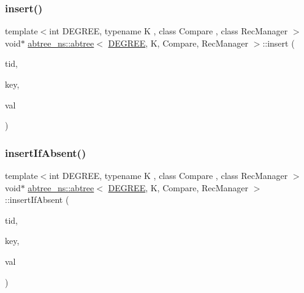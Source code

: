 \mbox{\label{classabtree__ns_1_1abtree_a951a74f5690dbbaf55ab121fa3b5c6ca}} 
\subsubsection{\texorpdfstring{insert()}{insert()}\hspace{0.1cm}{\footnotesize\ttfamily [2/2]}}
{\footnotesize\ttfamily template$<$int D\+E\+G\+R\+EE, typename K , class Compare , class Rec\+Manager $>$ \\
void$\ast$ \hyperlink{classabtree__ns_1_1abtree}{abtree\+\_\+ns\+::abtree}$<$ \hyperlink{brown__sigouin__abtree__kcas_2adapter_8h_a5d88b17d70c985f2f2b8e987037fd6dd}{D\+E\+G\+R\+EE}, K, Compare, Rec\+Manager $>$\+::insert (\begin{DoxyParamCaption}\item[{const int}]{tid,  }\item[{const K \&}]{key,  }\item[{void $\ast$const}]{val }\end{DoxyParamCaption})\hspace{0.3cm}{\ttfamily [inline]}}

\mbox{\label{classabtree__ns_1_1abtree_a560964a145c9c4d8525486aa9dda48d5}} 
\subsubsection{\texorpdfstring{insert\+If\+Absent()}{insertIfAbsent()}\hspace{0.1cm}{\footnotesize\ttfamily [1/2]}}
{\footnotesize\ttfamily template$<$int D\+E\+G\+R\+EE, typename K , class Compare , class Rec\+Manager $>$ \\
void$\ast$ \hyperlink{classabtree__ns_1_1abtree}{abtree\+\_\+ns\+::abtree}$<$ \hyperlink{brown__sigouin__abtree__kcas_2adapter_8h_a5d88b17d70c985f2f2b8e987037fd6dd}{D\+E\+G\+R\+EE}, K, Compare, Rec\+Manager $>$\+::insert\+If\+Absent (\begin{DoxyParamCaption}\item[{const int}]{tid,  }\item[{const K \&}]{key,  }\item[{void $\ast$const}]{val }\end{DoxyParamCaption})\hspace{0.3cm}{\ttfamily [inline]}}

